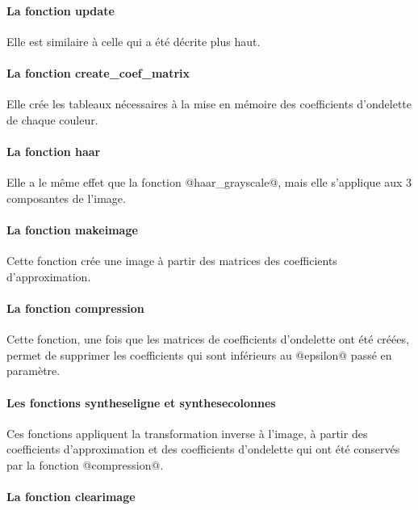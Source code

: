 \documentclass{article}
\begin{document}
\paragraph{La fonction update}

Elle est similaire à celle qui a été décrite plus haut.

\paragraph{La fonction create\_{}coef\_{}matrix}

Elle crée les tableaux nécessaires à la mise en mémoire des coefficients d'ondelette de chaque couleur.

\paragraph{La fonction haar}

Elle a le même effet que la fonction @haar\_{}grayscale@, mais elle s'applique aux 3 composantes de l'image.

\paragraph{La fonction makeimage}

Cette fonction crée une image à partir des matrices des coefficients d'approximation.

\paragraph{La fonction compression}

Cette fonction, une fois que les matrices de coefficients d'ondelette ont été créées, permet de supprimer les coefficients qui sont inférieurs au @epsilon@ passé en paramètre.

\paragraph{Les fonctions syntheseligne et synthesecolonnes}

Ces fonctions appliquent la transformation inverse à l'image, à partir des coefficients d'approximation et des coefficients d'ondelette qui ont été conservés par la fonction @compression@.

\paragraph{La fonction clearimage}
\end{document}
